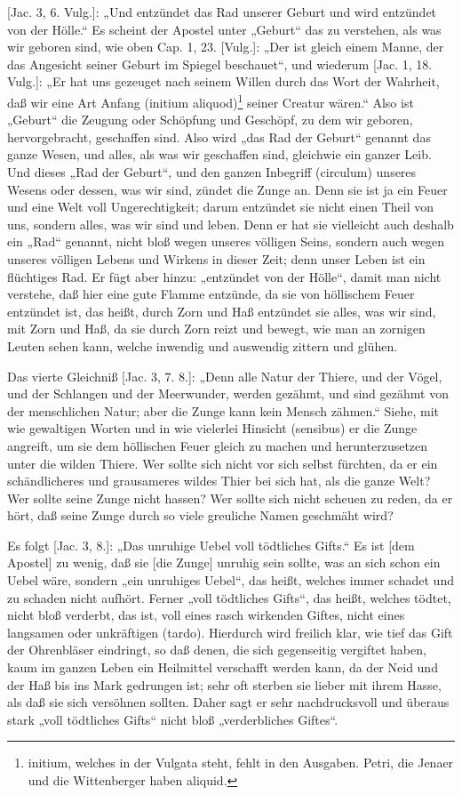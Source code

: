 [Jac. 3, 6. Vulg.]: „Und entzündet das Rad unserer Geburt und wird entzündet von der Hölle.“ Es scheint der Apostel unter „Geburt“ das zu verstehen, als was wir geboren sind, wie oben Cap. 1, 23. [Vulg.]: „Der ist gleich einem Manne, der das Angesicht seiner Geburt im Spiegel beschauet“, und wiederum [Jac. 1, 18. Vulg.]: „Er hat uns gezeuget nach seinem Willen durch das Wort der Wahrheit, daß wir eine Art Anfang (initium aliquod)\footnote{initium, welches in der Vulgata steht, fehlt in den Ausgaben. Petri, die Jenaer und die Wittenberger haben aliquid.} seiner Creatur wären.“ Also ist „Geburt“ die Zeugung oder Schöpfung und Geschöpf, zu dem wir geboren, hervorgebracht, geschaffen sind. Also wird „das Rad der Geburt“ genannt das ganze Wesen, und alles, als was wir geschaffen sind, gleichwie ein ganzer Leib. Und dieses „Rad der Geburt“, und den ganzen Inbegriff (circulum) unseres Wesens oder dessen, was wir sind, zündet die Zunge an. Denn sie ist ja ein Feuer und eine Welt voll Ungerechtigkeit; darum entzündet sie nicht einen Theil von uns, sondern alles, was wir sind und leben. Denn er hat sie vielleicht auch deshalb ein „Rad“ genannt, nicht bloß wegen unseres völligen Seins, sondern auch wegen unseres völligen Lebens und Wirkens in dieser Zeit; denn unser Leben ist ein flüchtiges Rad. Er fügt aber hinzu: „entzündet von der Hölle“, damit man nicht verstehe, daß hier eine gute Flamme entzünde, da sie von höllischem Feuer entzündet ist, das heißt, durch Zorn und Haß entzündet sie alles, was wir sind, mit Zorn und Haß, da sie durch Zorn reizt und bewegt, wie man an zornigen Leuten sehen kann, welche inwendig und auswendig zittern und glühen.

Das vierte Gleichniß [Jac. 3, 7. 8.]: „Denn alle Natur der Thiere, und der Vögel, und der Schlangen und der Meerwunder, werden gezähmt, und sind gezähmt von der menschlichen Natur; aber die Zunge kann kein Mensch zähmen.“ Siehe, mit wie gewaltigen Worten und in wie vielerlei Hinsicht (sensibus) er die Zunge angreift, um sie dem höllischen Feuer gleich zu machen und herunterzusetzen unter die wilden Thiere. Wer sollte sich nicht vor sich selbst fürchten, da er ein schändlicheres und grausameres wildes Thier bei sich hat, als die ganze Welt? Wer sollte seine Zunge nicht hassen? Wer sollte sich nicht scheuen zu reden, da er hört, daß seine Zunge durch so viele greuliche Namen geschmäht wird?

Es folgt [Jac. 3, 8.]: „Das unruhige Uebel voll tödtliches Gifts.“ Es ist [dem Apostel] zu wenig, daß sie [die Zunge] unruhig sein sollte, was an sich schon ein Uebel wäre, sondern „ein unruhiges Uebel“, das heißt, welches immer schadet und zu schaden nicht aufhört. Ferner „voll tödtliches Gifts“, das heißt, welches tödtet, nicht bloß verderbt, das ist, voll eines rasch wirkenden Giftes, nicht eines langsamen oder unkräftigen (tardo). Hierdurch wird freilich klar, wie tief das Gift der Ohrenbläser eindringt, so daß denen, die sich gegenseitig vergiftet haben, kaum im ganzen Leben ein Heilmittel verschafft werden kann, da der Neid und der Haß bis ins Mark gedrungen ist; sehr oft sterben sie lieber mit ihrem Hasse, als daß sie sich versöhnen sollten. Daher sagt er sehr nachdrucksvoll und überaus stark „voll tödtliches Gifts“ nicht bloß „verderbliches Giftes“.

